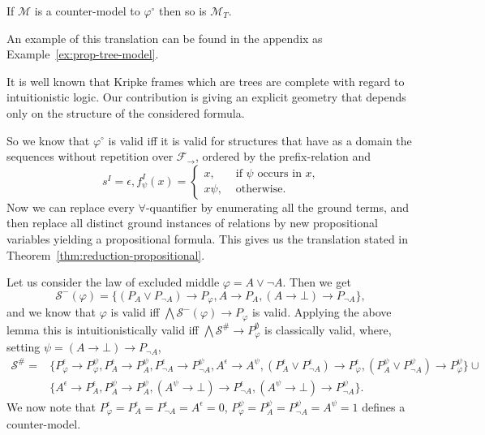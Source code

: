 \documentclass[a4paper,UKenglish,cleveref, autoref, thm-restate]{lipics-v2021}
\begin{document}
\begin{corollary}\label{cor:prop-tree-model}
	If $\mathcal M$ is a counter-model to $\varphi^\circ$ then so is $\mathcal M_T$.
\end{corollary}

An example of this translation can be found in the appendix as Example~\ref{ex:prop-tree-model}.

\begin{remark}
	It is well known that Kripke frames which are trees are complete with regard to intuitionistic logic. Our contribution is giving an explicit geometry that depends only on the structure of the considered formula.
\end{remark}


So we know that $\varphi^\circ$ is valid iff it is valid for structures that have as a domain the sequences without repetition over $\mathcal F_\to$, ordered by the prefix-relation and $$s^I = \epsilon, f_\psi^I(x) = \begin{cases}
	x, &\text{ if $\psi$ occurs in $x$,}\\
	x\psi, &\text{ otherwise.}
\end{cases}$$
Now we can replace every $\forall$-quantifier by enumerating all the ground terms, and then replace all distinct ground instances of relations by new propositional variables yielding a propositional formula. This gives us the translation stated in Theorem~\ref{thm:reduction-propositional}.

\begin{example}
	Let us consider the law of excluded middle $\varphi = A\vee\neg A$. Then we get
	$$\mathcal S^-(\varphi) = \{(P_A\vee P_{\neg A})\to P_\varphi, A\to P_A, (A\to \bot)\to P_{\neg A}\},$$
	and we know that $\varphi$ is valid iff $\bigwedge \mathcal S^-(\varphi)\to P_\varphi$ is valid. Applying the above lemma this is intuitionistically valid iff $\bigwedge\mathcal S^\#\to P^\emptyset_\varphi$ is classically valid, where, setting $\psi = (A\to \bot)\to P_{\neg A}$,
	\begin{align*}
		\mathcal S^\# =&\{P_\varphi^\epsilon\to P_\varphi^{\psi}, P_A^\epsilon\to P_A^{\psi},P_{\neg A}^\epsilon\to P_{\neg A}^{\psi},A^\epsilon\to A^{\psi}, (P_A^\epsilon\vee P_{\neg A}^\epsilon)\to P_\varphi^\epsilon, (P_A^{\psi}\vee P_{\neg A}^{\psi})\to P_\varphi^{\psi}\}\cup\\ &\{A^\epsilon\to P_A^\epsilon, P_A^{\psi}\to P_A^{\psi}, (A^{\psi}\to \bot)\to P_{\neg A}^\epsilon, (A^{\psi}\to \bot)\to P_{\neg A}^{\psi}\}.
	\end{align*}
	We now note that $P_\varphi^\epsilon  = P_A^\epsilon = P_{\neg A}^\epsilon = A^\epsilon = 0$, $P_{\varphi}^{\psi} = P_A^{\psi} =  P_{\neg A}^{\psi} = A^{\psi} = 1$ defines a counter-model.
\end{example}	
\end{document}
